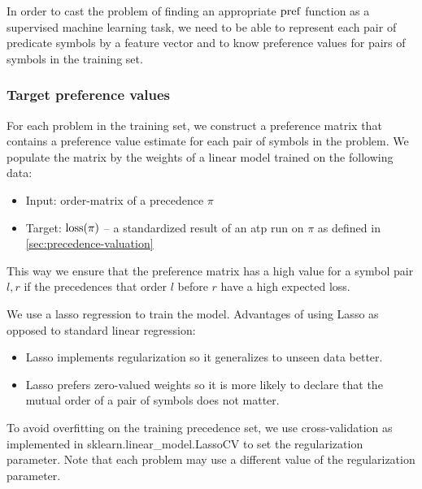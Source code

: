 In order to cast the problem of finding an appropriate \(\operatorname{pref}\) function
as a supervised machine learning task,
we need to be able to represent each pair of predicate symbols by a feature vector
and to know preference values for pairs of symbols in the training set.

\subsubsection{Target preference values}

For each problem in the training set, we construct a preference matrix that contains a preference
value estimate for each pair of symbols in the problem.
We populate the matrix by the weights of a linear model trained on the following data:

\begin{itemize}
	\item Input: \Gls{order-matrix} of a precedence \(\pi\)
	\item Target: \(\operatorname{loss}(\pi)\) --
	a standardized result of an \gls{atp} run on \(\pi\) as defined in \autoref{sec:precedence-valuation}
\end{itemize}

This way we ensure that the preference matrix has a high value for a symbol pair \(l, r\)
if the precedences that order \(l\) before \(r\) have a high expected loss.

We use a lasso regression \cite{?} to train the model.
Advantages of using Lasso as opposed to standard linear regression\cite{?}:

\begin{itemize}
	\item Lasso implements regularization so it generalizes to unseen data better.
	\item Lasso prefers zero-valued weights so it is more likely to declare that the mutual order of a pair of symbols does not matter.
\end{itemize}

To avoid overfitting on the training precedence set,
we use cross-validation as implemented in sklearn.linear\_model.LassoCV \cite{?}
to set the regularization parameter.
Note that each problem may use a different value of the regularization parameter.

